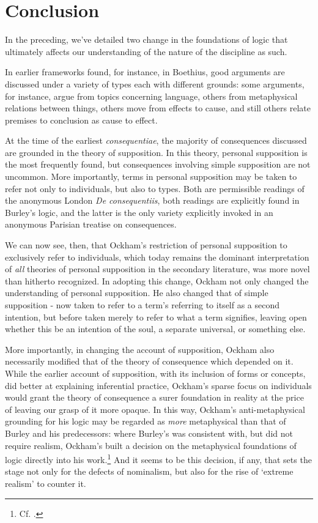 \documentclass[a4paper, 11pt]{article}
\begin{document}
\section{Conclusion}
In the preceding, we've detailed two change in the foundations of logic that ultimately affects our understanding of the nature of the discipline as such. 

In earlier frameworks found, for instance, in Boethius, good arguments are discussed under a variety of types each with different grounds: some arguments, for instance, argue from topics concerning language, others from metaphysical relations between things, others move from effects to cause, and still others relate premises to conclusion as cause to effect.

At the time of the earliest \emph{consequentiae}, the majority of consequences discussed are grounded in the theory of supposition. In this theory, personal supposition is the most frequently found, but consequences involving simple supposition are not uncommon. More importantly, terms in personal supposition may be taken to refer not only to individuals, but also to types. Both are permissible readings of the anonymous London \emph{De consequentiis}, both readings are explicitly found in Burley's logic, and the latter is the only variety explicitly invoked in an anonymous Parisian treatise on consequences.

We can now see, then, that Ockham's restriction of personal supposition to exclusively refer to individuals, which today remains the dominant interpretation of \emph{all} theories of personal supposition in the secondary literature, was more novel than hitherto recognized. In adopting this change, Ockham not only changed the understanding of personal supposition. He also changed that of simple supposition - now taken to refer to a term's referring to itself as a second intention, but before taken merely to refer to what a term signifies, leaving open whether this be an intention of the soul, a separate universal, or something else. 

More importantly, in changing the account of supposition, Ockham also necessarily modified that of the theory of consequence which depended on it. While the earlier account of supposition, with its inclusion of forms or concepts, did better at explaining inferential practice, Ockham's sparse focus on individuals would grant the theory of consequence a surer foundation in reality at the price of leaving our grasp of it more opaque. In this way, Ockham's anti-metaphysical grounding for his logic may be regarded as \emph{more} metaphysical than that of Burley and his predecessors: where Burley's was consistent with, but did not require realism, Ockham's built a decision on the metaphysical foundations of logic directly into his work.\footnote{Cf. \autocite{Read2007}.} And it seems to be this decision, if any, that sets the stage not only for the defects of nominalism, but also for the rise of `extreme realism' to counter it.
\end{document}

